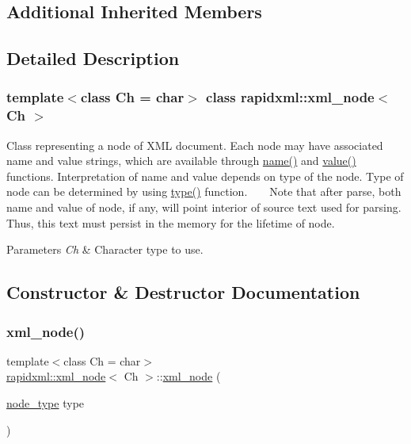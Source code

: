 \subsection*{Additional Inherited Members}


\subsection{Detailed Description}
\subsubsection*{template$<$class Ch = char$>$\newline
class rapidxml\+::xml\+\_\+node$<$ Ch $>$}

Class representing a node of X\+ML document. Each node may have associated name and value strings, which are available through \mbox{\hyperlink{classrapidxml_1_1xml__base_aef8ae147fbee59209f714274afc80dc4}{name()}} and \mbox{\hyperlink{classrapidxml_1_1xml__base_a6af65de5e59ac497cd69838f8a89d602}{value()}} functions. Interpretation of name and value depends on type of the node. Type of node can be determined by using \mbox{\hyperlink{classrapidxml_1_1xml__node_a5f91729128856b0aaab598d4364ace60}{type()}} function. ~\newline
~\newline
 Note that after parse, both name and value of node, if any, will point interior of source text used for parsing. Thus, this text must persist in the memory for the lifetime of node. 
\begin{DoxyParams}{Parameters}
{\em Ch} & Character type to use. \\
\hline
\end{DoxyParams}


\subsection{Constructor \& Destructor Documentation}
\mbox{\label{classrapidxml_1_1xml__node_a8bd9019960b90605a45998b661fb1b0e}} 
\subsubsection{\texorpdfstring{xml\+\_\+node()}{xml\_node()}}
{\footnotesize\ttfamily template$<$class Ch = char$>$ \\
\mbox{\hyperlink{classrapidxml_1_1xml__node}{rapidxml\+::xml\+\_\+node}}$<$ Ch $>$\+::\mbox{\hyperlink{classrapidxml_1_1xml__node}{xml\+\_\+node}} (\begin{DoxyParamCaption}\item[{\mbox{\hyperlink{rapidxml_8hpp_abb456db38f7efb746c4330eed6072a7c}{node\+\_\+type}}}]{type }\end{DoxyParamCaption})\hspace{0.3cm}{\ttfamily [inline]}}

